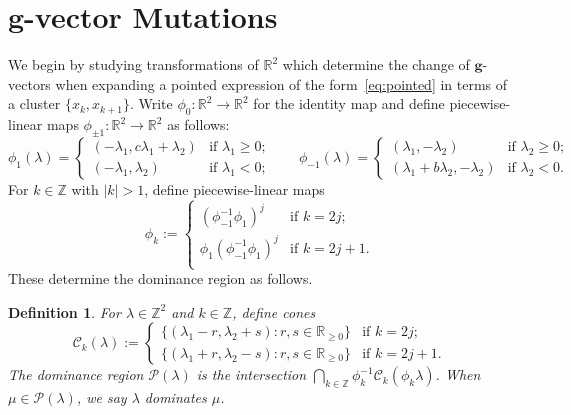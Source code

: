 \documentclass{amsart}
\newtheorem{definition}[theorem]{Definition}
\numberwithin{theorem}{section}
\newcommand{\bfg}{\boldsymbol{g}}
\newcommand{\cC}{\mathcal{C}}
\newcommand{\cP}{\mathcal{P}}
\newcommand{\RR}{\mathbb{R}}
\newcommand{\ZZ}{\mathbb{Z}}
\begin{document}
\section{$\bfg$-vector Mutations}
  We begin by studying transformations of $\RR^2$ which determine the change of $\bfg$-vectors when expanding a pointed expression of the form~\eqref{eq:pointed} in terms of a cluster $\{x_k,x_{k+1}\}$.
  Write $\phi_0:\RR^2\to\RR^2$ for the identity map and define piecewise-linear maps $\phi_{\pm 1}:\RR^2\to\RR^2$ as follows:
  \begin{equation}
    \phi_1(\lambda)
    =
    \begin{cases} 
      (-\lambda_1,c\lambda_1+\lambda_2) & \text{if $\lambda_1 \ge 0$;}\\
      (-\lambda_1,\lambda_2) & \text{if $\lambda_1 < 0$;}
    \end{cases}
    \qquad
    \phi_{-1}(\lambda)
    =
    \begin{cases} 
      (\lambda_1,-\lambda_2) & \text{if $\lambda_2 \ge 0$;}\\
      (\lambda_1+b\lambda_2,-\lambda_2) & \text{if $\lambda_2 < 0$.}
    \end{cases}
  \end{equation}
  For $k\in\ZZ$ with $|k|>1$, define piecewise-linear maps
  \[\phi_k
    :=
    \begin{cases}
      (\phi_{-1}^{-1}\phi_1)^j & \text{if $k=2j$;}\\
      \phi_1(\phi_{-1}^{-1}\phi_1)^j & \text{if $k=2j+1$.}\\
    \end{cases}
  \]
  These determine the dominance region as follows.
  \begin{definition}
    For $\lambda\in\ZZ^2$ and $k\in\ZZ$, define cones 
    \[\cC_k(\lambda)
      :=
      \begin{cases}
        \{(\lambda_1-r,\lambda_2+s):r,s\in\RR_{\ge0}\} & \text{if $k=2j$;}\\
        \{(\lambda_1+r,\lambda_2-s):r,s\in\RR_{\ge0}\} & \text{if $k=2j+1$.}
      \end{cases}
    \]
    The \emph{dominance region} $\cP(\lambda)$ is the intersection  $\bigcap_{k\in\ZZ}\phi_k^{-1}\cC_k(\phi_k\lambda)$.
    When $\mu\in\cP(\lambda)$, we say \emph{$\lambda$ dominates $\mu$}.
  \end{definition}
\end{document}
